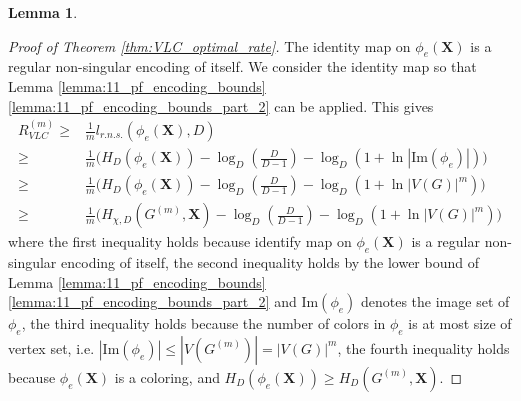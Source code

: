 \documentclass[journal, onecolumn, draftcls]{IEEEtran}
\theoremstyle{definition}
\newtheorem{lemma}{Lemma}
\newcommand{\bfX}{\mathbf{X}}
\newcommand{\meng}[1]{\marginpar{+}{\bf Ruoyu's remark}: {\em #1}}
\newcommand{\aditya}[1]{\marginpar{+}{\bf Aditya's remark}: {\em #1}}
\begin{document}
\begin{lemma}
\begin{proof}[Proof of Theorem \ref{thm:VLC_optimal_rate}]
    The identity map on  $\phi_e(\bfX)$ is a regular non-singular encoding of itself. We consider the identity map so that Lemma \ref{lemma:11_pf_encoding_bounds} \ref{lemma:11_pf_encoding_bounds_part_2} can be applied. This gives %
    \begin{align*} 
    R^{(m)}_{VLC}\ge &\frac{1}{m}l_{r.n.s.}(\phi_e(\bfX),D)\\
    \ge & \frac{1}{m}\big ( H_D(\phi_e(\bfX)) - \log_D\left(\frac{D}{D-1}\right)  - \log_D(1+\ln |\text{Im}(\phi_e)|)\big )\\
    \ge & \frac{1}{m}\big ( H_D(\phi_e(\bfX))- \log_D\left(\frac{D}{D-1}\right)   - \log_D(1+\ln |V(G)|^m)    \big )\\
    \ge & \frac{1}{m}\big ( H_{\chi,D}(G^{(m)},\bfX)- \log_D\left(\frac{D}{D-1}\right)   - \log_D(1+\ln |V(G)|^m)    \big )
    \end{align*}
where the first inequality holds because identify map on $\phi_e(\bfX)$ is a regular non-singular encoding of itself, the second inequality holds by the lower bound of Lemma \ref{lemma:11_pf_encoding_bounds}  \ref{lemma:11_pf_encoding_bounds_part_2} and $\text{Im}(\phi_e)$ denotes the image set of $\phi_e$, the third inequality holds because the number of colors in $\phi_e$ is at most size of vertex set, i.e. $|\text{Im}(\phi_e)|\le |V(G^{(m)})|=|V(G )|^m$, the fourth inequality holds because $\phi_e(\bfX)$ is a coloring, and $H_D(\phi_e(\bfX))\ge H_D(G^{(m)},\bfX)$.


\end{proof}
\end{lemma}
\end{document}
